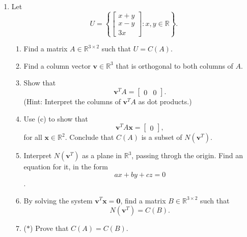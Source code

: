 \documentclass[12pt]{amsart}
\newcommand{\RR}{\mathbb{R}}
\theoremstyle{definition} \newtheorem{definition}[theorem]{Definition}
\newcommand{\bv}{\mathbf{v}}
\newcommand{\bx}{\mathbf{x}}
\newcommand{\bzero}{\mathbf{0}}
\newcommand{\mat}[1]{\begin{bmatrix}#1\end{bmatrix}}
\begin{document}
\begin{enumerate}
    
  \item Let
    \[
      U = \left\{\mat{x + y\\x-y\\3x} : x,y\in\RR\right\}.
    \]
    \begin{enumerate}
  \setlength{\itemsep}{0.5em}
      \item Find a matrix $A\in\RR^{3\times 2}$ such that $U=C(A)$.
      \item Find a column vector $\bv\in\RR^3$ that is orthogonal to both columns of $A$.
      \item Show that
        \[
          \bv^TA = \mat{0&0}.
        \]
        (Hint: Interpret the columns of $\bv^TA$ as dot products.)
      \item Use (c) to show that
        \[
          \bv^TA\bx=\mat{0},
        \]
        for all $\bx\in\RR^2$. Conclude that $C(A)$ is a subset of $N(\bv^T)$.
      \item Interpret $N(\bv^T)$ as a plane in $\RR^3$, passing throgh the origin.
        Find an equation for it, in the form
        \[
          ax+by+cz=0
        \].
      \item By solving the system $\bv^T\bx=\bzero$, find a matrix $B\in\RR^{3\times 2}$ such that
        \[
          N(\bv^T)=C(B).
        \]
      \item ($*$) Prove that $C(A)=C(B)$.
    \end{enumerate}
\end{enumerate}
\end{document}
